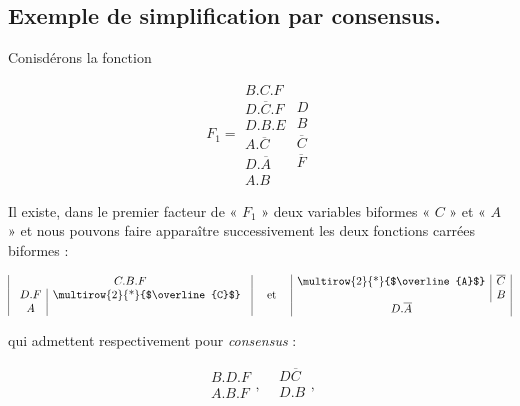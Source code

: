 \subsection{Exemple de simplification par consensus.} Conisdérons la fonction 

\[ F_1 = \begin{array}{|l|} B . C . F \\
                            D . \overline{C} . F \\
                            D . B . E \\
                            A . \overline{C} \\
                            D . \overline{A}\\
                            A . B \end{array} \begin{array}{c|} D \\ B \\ \overline{C} \\ \overline{F}\end{array} 
\]

Il existe, dans le premier facteur de  « $F_1$ » deux variables biformes « $C$ » et « $A$ » et nous pouvons faire apparaître successivement les deux fonctions carrées biformes : 

\[  \begin{array}{|c|} C . B . F \\
           \begin{array}{c|c} D . F & $\multirow{2}{*}{$\overline{C}$}$\\
                                  A & \\            \end{array} 
\end{array}                             
                    \quad   \text { et } \quad 
              \begin{array}{|c|c|} 
             $\multirow{2}{*}{$\overline{A}$}$ & \overline{C} \\
                          & B \\
           \multicolumn{2}{|c|}{D . \overline{A} }  \\          
              \end{array} 
\] 

qui admettent respectivement pour \textsl{consensus} : 

\[ \begin{array}{|c|} B . D . F \\ A . B . F \end{array} \text{,} \quad \begin{array}{|c|} D \overline{C} \\ D . B \\ \end{array} \text{,} \]  


